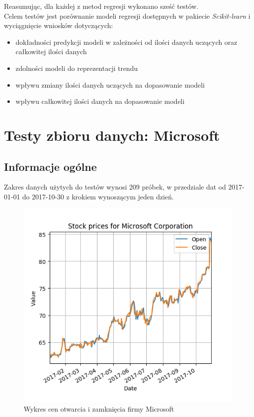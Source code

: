 Reasumując, dla każdej z metod regresji wykonano sześć testów.\\

Celem testów jest porównanie modeli regresji dostępnych w pakiecie \textit{Scikit-learn} i wyciągnięcie wniosków dotyczących:
\begin{itemize}
 \item dokładności predykcji modeli w zależności od ilości danych uczących oraz całkowitej ilości danych
 \item zdolności modeli do reprezentacji trendu
 \item wpływu zmiany ilości danych uczących na dopasowanie modeli
 \item wpływu całkowitej ilości danych na dopasowanie modeli
\end{itemize}



\section{Testy zbioru danych: Microsoft}

\subsection{Informacje ogólne}
Zakres danych użytych do testów wynosi 209 próbek, w przedziale dat od 2017-01-01 do 2017-10-30 z krokiem wynoszącym jeden dzień.\\

\begin{figure}[ht]
\centering
\includegraphics[scale=0.4]{pictures/plots/microsoft_oc_price.png}
\caption{Wykres cen otwarcia i zamknięcia firmy Microsoft}
\label{fig:microsoft_oc_price}
\end{figure}

